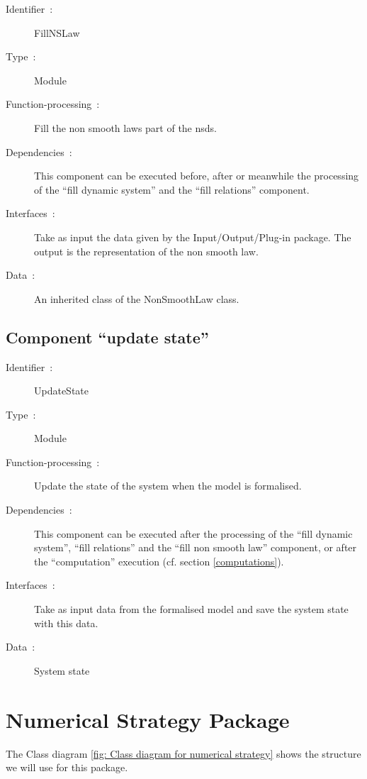 		\begin{description}
	
		\item[Identifier~:]FillNSLaw
		\item[Type~:]Module
		\item[Function-processing~:]Fill the non smooth laws part of the \ac{nsds}.
		\item[Dependencies~:]This component can be executed before, after or meanwhile the processing of the ``fill dynamic system'' and the ``fill relations'' component.
		\item[Interfaces~:]Take as input the data given by the Input/Output/Plug-in package. The output is the representation of the non smooth law.
		\item[Data~:]An inherited class of the NonSmoothLaw class.

		\end{description}

	
  	\subsection{Component ``update state''} \label{update_state}
	
		\begin{description}
	
		\item[Identifier~:]UpdateState
		\item[Type~:]Module
		\item[Function-processing~:]Update the state of the system when the model is formalised.
		\item[Dependencies~:]This component can be executed after the processing of the ``fill dynamic system'', ``fill relations'' and the ``fill non smooth law'' component, or after the ``computation'' execution (cf. section \ref{computations}).
		\item[Interfaces~:]Take as input data from the formalised model and save the system state with this data.
		\item[Data~:]System state

		\end{description}
	

\section{Numerical Strategy Package}

	The Class diagram \ref{fig: Class diagram for numerical strategy} shows the structure we will use for this package.
	
